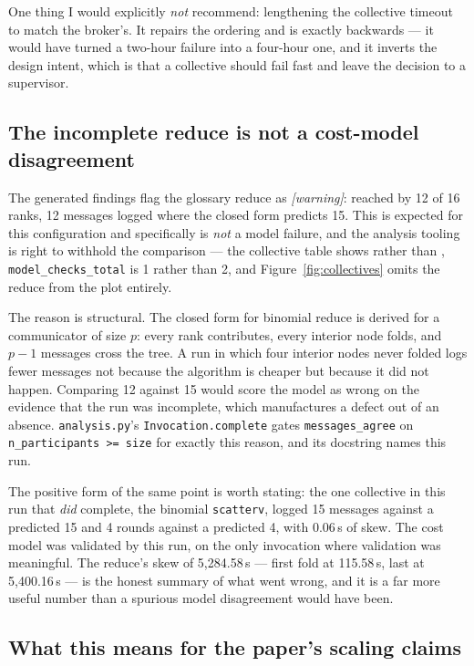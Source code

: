 \documentclass[11pt]{article}
\begin{document}
One thing I would explicitly \emph{not} recommend: lengthening the collective timeout to
match the broker's. It repairs the ordering and is exactly backwards --- it would have
turned a two-hour failure into a four-hour one, and it inverts the design intent, which is
that a collective should fail fast and leave the decision to a supervisor.

\subsection{The incomplete reduce is not a cost-model disagreement}
\label{sec:notamodelfailure}

The generated findings flag the glossary reduce as \emph{[warning]}: reached by 12 of 16
ranks, 12 messages logged where the closed form predicts 15. This is expected for this
configuration and specifically is \emph{not} a model failure, and the analysis tooling is
right to withhold the comparison --- the collective table shows \modelna{} rather than
\modelbad{}, \texttt{model\_checks\_total} is 1 rather than 2, and
Figure~\ref{fig:collectives} omits the reduce from the plot entirely.

The reason is structural. The closed form for binomial reduce is derived for a
communicator of size $p$: every rank contributes, every interior node folds, and $p-1$
messages cross the tree. A run in which four interior nodes never folded logs fewer
messages not because the algorithm is cheaper but because it did not happen. Comparing 12
against 15 would score the model as wrong on the evidence that the run was incomplete,
which manufactures a defect out of an absence. \texttt{analysis.py}'s
\texttt{Invocation.complete} gates \texttt{messages\_agree} on
\texttt{n\_participants >= size} for exactly this reason, and its docstring names this
run.

The positive form of the same point is worth stating: the one collective in this run that
\emph{did} complete, the binomial \texttt{scatterv}, logged 15 messages against a
predicted 15 and 4 rounds against a predicted 4, with 0.06\,s of skew. The cost model was
validated by this run, on the only invocation where validation was meaningful. The
reduce's skew of 5{,}284.58\,s --- first fold at 115.58\,s, last at 5{,}400.16\,s --- is
the honest summary of what went wrong, and it is a far more useful number than a spurious
model disagreement would have been.

\subsection{What this means for the paper's scaling claims}
\label{sec:scaling}
\end{document}
